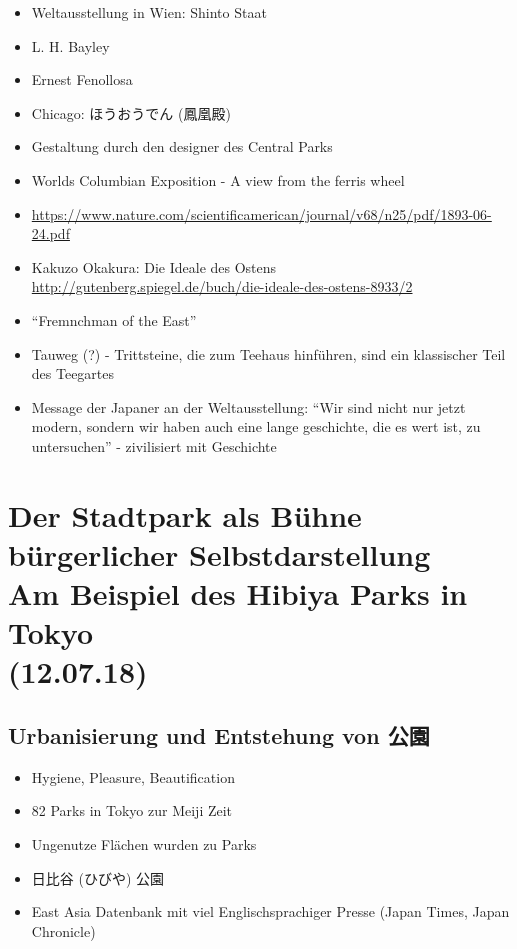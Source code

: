 \documentclass[emulatestandardclasses]{scrartcl}
\begin{document}
\begin{itemize}
  \item Weltausstellung in Wien: Shinto Staat
  \item L. H. Bayley
  \item Ernest Fenollosa
  \item Chicago: ほうおうでん (鳳凰殿)
  \item Gestaltung durch den designer des Central Parks
  \item Worlds Columbian Exposition - A view from the ferris wheel
  \item \url{https://www.nature.com/scientificamerican/journal/v68/n25/pdf/1893-06-24.pdf}
  \item Kakuzo Okakura: Die Ideale des Ostens \url{http://gutenberg.spiegel.de/buch/die-ideale-des-ostens-8933/2}
  \item "`Fremnchman of the East"'
  \item Tauweg (?) - Trittsteine, die zum Teehaus hinführen, sind ein klassischer Teil des Teegartes
  \item Message der Japaner an der Weltausstellung: "`Wir sind nicht nur jetzt modern, sondern wir haben auch eine lange geschichte, die es wert ist, zu untersuchen"' - zivilisiert mit Geschichte
\end{itemize}

\section{Der Stadtpark als Bühne bürgerlicher Selbstdarstellung\\Am Beispiel des Hibiya Parks in Tokyo
\\(12.07.18)}

\subsection{Urbanisierung und Entstehung von 公園}

\begin{itemize}
  \item Hygiene, Pleasure, Beautification
  \item 82 Parks in Tokyo zur Meiji Zeit
  \item Ungenutze Flächen wurden zu Parks 
  \item 日比谷 (ひびや) 公園
  \item East Asia Datenbank mit viel Englischsprachiger Presse (Japan Times, Japan Chronicle)
\end{itemize}
\end{document}
